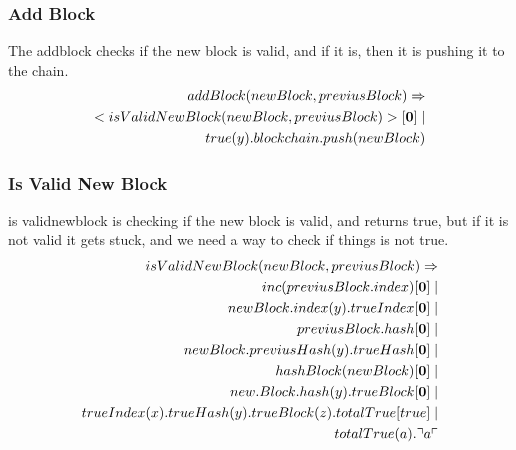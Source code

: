 \subsubsection{Add Block}
The addblock checks if the new block is valid, and if it is, then it is pushing it to the chain.
\begin{align*}
    addBlock(newBlock, previusBlock) \Rightarrow\\
    <isValidNewBlock(newBlock, previusBlock)>[\mathbf{0}]\mid \\
    true(y).blockchain.push(newBlock)
\end{align*}

\subsubsection{Is Valid New Block}
is validnewblock is checking if the new block is valid, and returns true, but if it is not valid it gets stuck, and we need a way to check if things is not true.
\begin{align*}
    isValidNewBlock(newBlock, previusBlock) \Rightarrow\\
    inc(previusBlock.index)[\mathbf{0}] \mid \\
    newBlock.index(y).trueIndex[\mathbf{0}] \mid \\
    previusBlock.hash[\mathbf{0}] \mid \\
    newBlock.previusHash(y).trueHash[\mathbf{0}] \mid \\
    hashBlock(newBlock)[\mathbf{0}] \mid \\
    new.Block.hash(y).trueBlock[\mathbf{0}] \mid \\
    trueIndex(x).trueHash(y).trueBlock(z).totalTrue[true] \mid \\
    totalTrue(a).\urcorner a \ulcorner
\end{align*}




